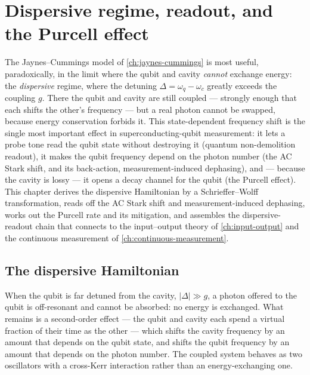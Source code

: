 \chapter{Dispersive regime, readout, and the Purcell effect}
\label{ch:dispersive}

The Jaynes--Cummings model of \cref{ch:jaynes-cummings} is most
useful, paradoxically, in the limit where the qubit and cavity
\emph{cannot} exchange energy: the \emph{dispersive} regime, where
the detuning $\Delta=\omega_q-\omega_c$ greatly exceeds the coupling
$g$. There the qubit and cavity are still coupled --- strongly
enough that each shifts the other's frequency --- but a real photon
cannot be swapped, because energy conservation forbids it. This
state-dependent frequency shift is the single most important effect
in superconducting-qubit measurement: it lets a probe tone read the
qubit state without destroying it (quantum non-demolition readout),
it makes the qubit frequency depend on the photon number (the AC
Stark shift, and its back-action, measurement-induced dephasing),
and --- because the cavity is lossy --- it opens a decay channel for
the qubit (the Purcell effect). This chapter derives the dispersive
Hamiltonian by a Schrieffer--Wolff transformation, reads off the AC
Stark shift and measurement-induced dephasing, works out the Purcell
rate and its mitigation, and assembles the dispersive-readout chain
that connects to the input--output theory of \cref{ch:input-output}
and the continuous measurement of \cref{ch:continuous-measurement}.

\section{The dispersive Hamiltonian}
\label{sec:dispersive}

\begin{phenomenon}
When the qubit is far detuned from the cavity, $|\Delta|\gg g$, a
photon offered to the qubit is off-resonant and cannot be absorbed:
no energy is exchanged. What remains is a second-order effect ---
the qubit and cavity each spend a virtual fraction of their time as
the other --- which shifts the cavity frequency by an amount that
depends on the qubit state, and shifts the qubit frequency by an
amount that depends on the photon number. The coupled system
behaves as two oscillators with a cross-Kerr interaction rather than
an energy-exchanging one.
\end{phenomenon}


